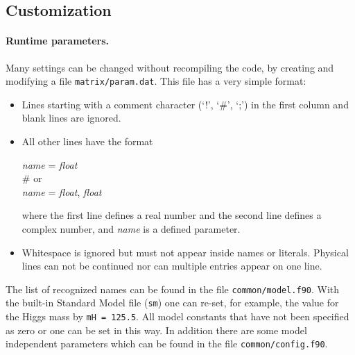 \documentclass[11pt,a4paper]{refrep}
\begin{document}
\subsection{Customization}\label{sec:Customization}
\paragraph{Runtime parameters.}
Many settings can be changed without recompiling the code, by
creating and modifying a file \texttt{matrix/param.dat}.
This file has a very simple format:
\begin{itemize}
\item Lines starting with a comment character (`!', `\#', `;')
      in the first column and blank lines are ignored.
\item All other lines have the format
\begin{example}
\textit{name} = \textit{float}\\
\# \textrm{or}\\
\textit{name} = \textit{float}, \textit{float}
\end{example}
      where the first line defines a real number and the second
      line defines a complex number, and \textit{name} is a defined
      parameter.
\item Whitespace is ignored but must not appear inside names or
      literals. Physical lines can not be continued nor can
      multiple entries appear on one line.
\end{itemize}
The list of recognized names can be found in the file
\texttt{common/model.f90}. 
With the built-in Standard Model file (\texttt{sm}) one
can re-set, for example, the value for the Higgs mass by 
{\tt mH = 125.5}.
All model constants that have not been specified as zero or one
can be set in this way. 
In addition there are some model independent parameters which can be found in the file 
\texttt{common/config.f90}.
\end{document}
